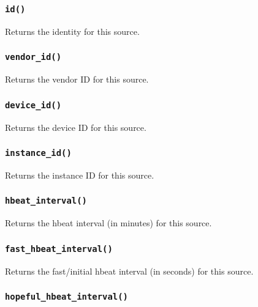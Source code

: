 \subsubsection*{\texttt{id()}\label{xPL::Client_id_}}


Returns the identity for this source.

\subsubsection*{\texttt{vendor\_id()}\label{xPL::Client_vendor_id_}}


Returns the vendor ID for this source.

\subsubsection*{\texttt{device\_id()}\label{xPL::Client_device_id_}}


Returns the device ID for this source.

\subsubsection*{\texttt{instance\_id()}\label{xPL::Client_instance_id_}}


Returns the instance ID for this source.

\subsubsection*{\texttt{hbeat\_interval()}\label{xPL::Client_hbeat_interval_}}


Returns the hbeat interval (in minutes) for this source.

\subsubsection*{\texttt{fast\_hbeat\_interval()}\label{xPL::Client_fast_hbeat_interval_}}


Returns the fast/initial hbeat interval (in seconds) for this source.

\subsubsection*{\texttt{hopeful\_hbeat\_interval()}\label{xPL::Client_hopeful_hbeat_interval_}}


